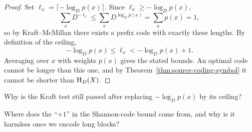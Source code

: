 \begin{proof}
Set $\ell_x=\lceil-\log_Dp(x)\rceil$. Since
$\ell_x\ge-\log_Dp(x)$,
\[
  \sum_xD^{-\ell_x}
  \le\sum_xD^{\log_Dp(x)}
  =\sum_xp(x)=1,
\]
so by Kraft--McMillan there exists a prefix code with exactly these lengths. By
definition of the ceiling,
\[
  -\log_Dp(x)\le\ell_x<-\log_Dp(x)+1 .
\]
Averaging over $x$ with weights $p(x)$ gives the stated bounds. An optimal code
cannot be longer than this one, and by
Theorem~\ref{thm:source-coding-symbol} it cannot be shorter than $\mathrm{H}_D(X)$.
\end{proof}

\begin{yourturn}
Why is the Kraft test still passed after replacing $-\log_Dp(x)$ by its ceiling?
\ifshowanswers\else\workspace[1]\fi
{}
\end{yourturn}

\begin{yourturn}
Where does the ``$+1$'' in the Shannon-code bound come from, and why is it
harmless once we encode long blocks?
\ifshowanswers\else\workspace[2]\fi
{}
\end{yourturn}

\vspace{0.8cm}
